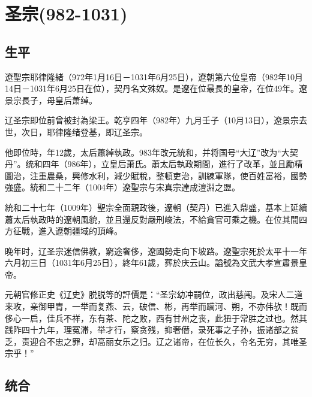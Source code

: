 
\section{圣宗\tiny(982-1031)}

\subsection{生平}

遼聖宗耶律隆緒（972年1月16日－1031年6月25日），遼朝第六位皇帝（982年10月14日－1031年6月25日在位），契丹名文殊奴。是遼在位最長的皇帝，在位49年。遼景宗長子，母皇后萧绰。

辽圣宗即位前曾被封為梁王。乾亨四年（982年）九月壬子（10月13日），遼景宗去世，次日，耶律隆绪登基，即辽圣宗。

他即位時，年12歲，太后蕭綽執政。983年改元統和，并将国号“大辽”改为“大契丹”。统和四年（986年），立皇后萧氏。蕭太后執政期間，進行了改革，並且勵精圖治，注重農桑，興修水利，減少賦稅，整頓吏治，訓練軍隊，使百姓富裕，國勢強盛。統和二十二年（1004年）遼聖宗与宋真宗達成澶淵之盟。

統和二十七年（1009年）聖宗全面親政後，遼朝（契丹）已進入鼎盛，基本上延續蕭太后執政時的遼朝風貌，並且還反對嚴刑峻法，不給貪官可乘之機。在位其間四方征戰，進入遼朝疆域的頂峰。

晚年时，辽圣宗迷信佛教，窮途奢侈，遼國勢走向下坡路。遼聖宗死於太平十一年六月初三日（1031年6月25日），終年61歲，葬於庆云山。謚號為文武大孝宣肅景皇帝。

元朝官修正史《辽史》脱脱等的評價是：“圣宗幼冲嗣位，政出慈闱。及宋人二道来攻，亲御甲胄，一举而复燕、云，破信、彬，再举而躏河、朔，不亦伟欤！既而侈心一启，佳兵不祥，东有茶、陀之败，西有甘州之丧，此狃于常胜之过也。然其践阼四十九年，理冤滞，举才行，察贪残，抑奢僣，录死事之子孙，振诸部之贫乏，责迎合不忠之罪，却高丽女乐之归。辽之诸帝，在位长久，令名无穷，其唯圣宗乎！”

\subsection{统合}

